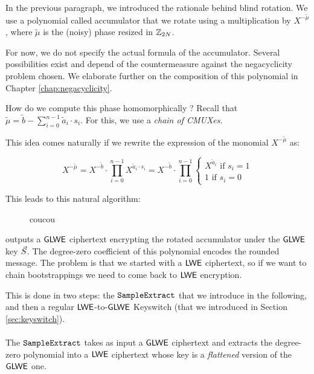 In the previous paragraph, we introduced the rationale behind blind rotation. We use a polynomial called accumulator that we rotate using a multiplication by $X^{-\tilde \mu}$, where $\tilde \mu$ is the (noisy) phase resized in $\mathbb{Z}_{2N}$.

For now, we do not specify the actual formula of the accumulator. Several possibilities exist and depend of the countermeasure against the negacyclicity problem chosen. We elaborate further on the composition of this polynomial in Chapter \ref{chap:negacyclicity}.


How do we compute this phase homomorphically ? Recall that $\tilde \mu = \tilde b - \sum_{i=0}^{n-1} \tilde a_i \cdot s_i$. For this, we use a \textit{chain of CMUXes}.


This idea comes naturally if we rewrite the expression of the monomial $X^{-\tilde \mu}$ as:

\[
	X^{-\tilde \mu} = X^{-\tilde b} \cdot \prod_{i=0}^{n-1} X^{\tilde a_i \cdot s_i} = X^{-\tilde b} \cdot \prod_{i=0}^{n-1} \begin{cases}
		X^{\tilde a_i} \text{ if } s_i = 1\\
		1 \text{ if } s_i = 0
	\end{cases}
\]


This leads to this natural algorithm:





\begin{figure}
	\centering
	\cmuxScratchpad
	\caption{coucou}
	\label{fig:cmux}
\end{figure}


\BlindRotate outputs a $\textsf{GLWE}$ ciphertext encrypting the rotated accumulator under the $\textsf{GLWE}$ key $\vec S$. The degree-zero coefficient of this polynomial encodes the rounded message. The problem is that we started with a $\textsf{LWE}$ ciphertext, so if we want to chain bootstrappings we need to come back to $\textsf{LWE}$ encryption.


This is done in two steps: the $\texttt{SampleExtract}$ that we introduce in the following, and then a regular $\textsf{LWE}$-to-$\textsf{GLWE}$ Keyswitch (that we introduced in Section \ref{sec:keyswitch}).


\paragraph{\SampleExtract}

The $\texttt{SampleExtract}$ takes as input a $\textsf{GLWE}$ ciphertext and extracts the degree-zero polynomial into a $\textsf{LWE}$ ciphertext whose key is a \textit{flattened} version of the $\textsf{GLWE}$ one. 






